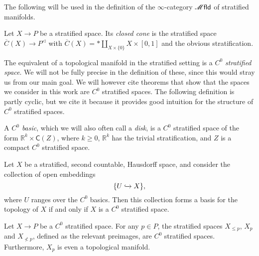 \documentclass[../text]{subfiles}
\begin{document}
The following will be used in the definition of the $\infty$-category $\mfld$ of stratified manifolds.

\begin{definition}
    Let $X\to P$ be a stratified space. Its \emph{closed cone} is the stratified space $\overline{C}(X)\to P^{\vartriangleleft}$ with $\overline{C}(X)=\ast\amalg_{X\times\{0\}}X\times[0,1]$ and the obvious stratification.
\end{definition}

The equivalent of a topological manifold in the stratified setting is a \emph{$C^0$ stratified space}. We will not be fully precise in the definition of these, since this would stray us from our main goal. We will however cite theorems that show that the spaces we consider in this work are $C^0$ stratified spaces. The following definition is partly cyclic, but we cite it because it provides good intuition for the structure of $C^0$ stratified spaces.

\begin{definition}
    A \emph{$C^0$ basic}, which we will also often call a \emph{disk}, is a $C^0$ stratified space of the form $\mathbb{R}^k \times \mathsf{C}(Z)$, where $k \geq 0$, $\mathbb{R}^k$ has the trivial stratification, and $Z$ is a compact $C^0$ stratified space.
\end{definition}

\begin{theorem}\label{thm:basics_give_basis}
    Let $X$ be a stratified, second countable, Hausdorff space, and consider the collection of open embeddings
    \begin{equation}
        \{ U \xhookrightarrow{} X\},
    \end{equation}
    where $U$ ranges over the $C^0$ basics. Then this collection forms a basis for the topology of $X$ if and only if $X$ is a $C^0$ stratified space.
\end{theorem}

\begin{theorem}
    Let $X \rightarrow P$ be a $C^0$ stratified space. For any $p \in P$, the stratified spaces $X_{\leq p}$, $X_{p}$ and $X_{\nless p}$, defined as the relevant preimages, are $C^0$ stratified spaces. Furthermore, $X_p$ is even a topological manifold.
\end{theorem}
\end{document}
